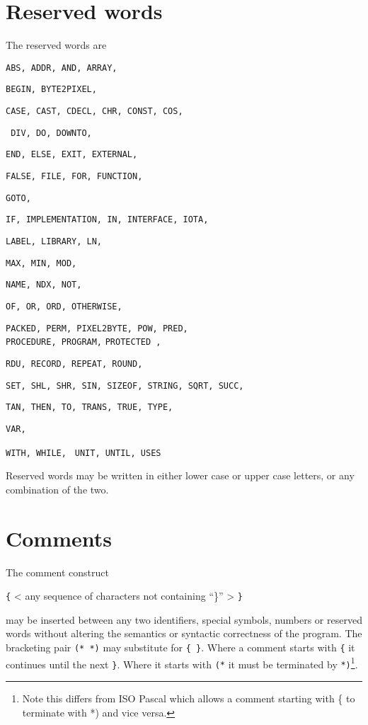 \section{Reserved words}
\label{resw}
The reserved words are {%

	\texttt{{ABS, ADDR, AND, ARRAY,}}

	\texttt{{BEGIN, BYTE2PIXEL,}}

	\texttt{{CASE, CAST, CDECL, CHR, CONST, COS,}}

	\texttt{{ DIV, DO, DOWNTO,}}

	\texttt{{END, ELSE, EXIT, EXTERNAL,}}

	\texttt{{FALSE, FILE, FOR, FUNCTION,}}

	\texttt{{GOTO,}}

	\texttt{{IF, IMPLEMENTATION, IN, INTERFACE, IOTA,}}

	\texttt{{LABEL, LIBRARY, LN,}}

	\texttt{{MAX, MIN, MOD,}}

	\texttt{{NAME, NDX,  NOT,}}

	\texttt{{OF, OR, ORD, OTHERWISE},}

	{\tt PACKED, PERM, PIXEL2BYTE,  POW,  PRED,} \\{\tt PROCEDURE,  PROGRAM,}
{\tt  PROTECTED ,}

	\texttt{{RDU,  RECORD, REPEAT, ROUND,}}

	\texttt{{SET, SHL, SHR, SIN, SIZEOF, STRING, SQRT, SUCC,}}

	\texttt{{TAN, THEN, TO, TRANS, TRUE, TYPE,}}

	\texttt{{VAR,}}

	\texttt{{WITH, WHILE, }}
	\texttt{{UNIT, UNTIL, USES }}
}

Reserved words may be written in either lower case or upper case letters, or
any combination of the two. 


\section{Comments}

The comment construct 

\texttt{\{\index{}} < any sequence of characters not containing {}``\}{}''
> \texttt{\}} 

may be inserted between any two identifiers, special symbols, numbers or reserved
words without altering the semantics or syntactic correctness of the program.
The bracketing pair \texttt{({*} {*})\index{*)}} may substitute for \texttt{\{
\}}. Where a comment starts with \texttt{\{} it continues until the next \texttt{\}}.
Where it starts with \texttt{({*}\index{(*}} it must be terminated by \texttt{{*})}\footnote{%
Note this differs from ISO Pascal which allows a comment starting with \{ to
terminate with {*}) and vice versa.
}.


